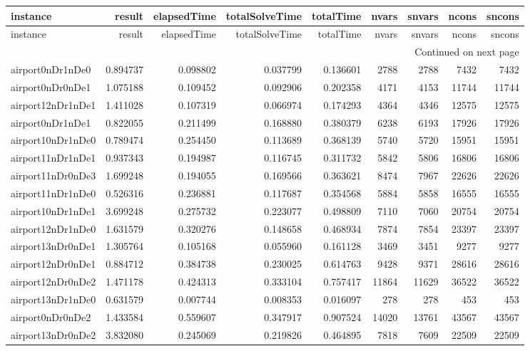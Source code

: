 \begin{longtable}{|l|r|r|r|r|r|r|r|r|}
\toprule
instance & result & elapsedTime & totalSolveTime & totalTime & nvars & snvars & ncons & sncons \\
\midrule
\endfirsthead
\toprule
instance & result & elapsedTime & totalSolveTime & totalTime & nvars & snvars & ncons & sncons \\
\midrule
\endhead
\midrule
\multicolumn{9}{r}{Continued on next page} \\
\midrule
\endfoot
\bottomrule
\endlastfoot
airport0nDr1nDe0 & 0.894737 & 0.098802 & 0.037799 & 0.136601 & 2788 & 2788 & 7432 & 7432 \\
airport0nDr0nDe1 & 1.075188 & 0.109452 & 0.092906 & 0.202358 & 4171 & 4153 & 11744 & 11744 \\
airport12nDr1nDe1 & 1.411028 & 0.107319 & 0.066974 & 0.174293 & 4364 & 4346 & 12575 & 12575 \\
airport0nDr1nDe1 & 0.822055 & 0.211499 & 0.168880 & 0.380379 & 6238 & 6193 & 17926 & 17926 \\
airport10nDr1nDe0 & 0.789474 & 0.254450 & 0.113689 & 0.368139 & 5740 & 5720 & 15951 & 15951 \\
airport11nDr1nDe1 & 0.937343 & 0.194987 & 0.116745 & 0.311732 & 5842 & 5806 & 16806 & 16806 \\
airport11nDr0nDe3 & 1.699248 & 0.194055 & 0.169566 & 0.363621 & 8474 & 7967 & 22626 & 22626 \\
airport11nDr1nDe0 & 0.526316 & 0.236881 & 0.117687 & 0.354568 & 5884 & 5858 & 16555 & 16555 \\
airport10nDr1nDe1 & 3.699248 & 0.275732 & 0.223077 & 0.498809 & 7110 & 7060 & 20754 & 20754 \\
airport12nDr1nDe0 & 1.631579 & 0.320276 & 0.148658 & 0.468934 & 7874 & 7854 & 23397 & 23397 \\
airport13nDr0nDe1 & 1.305764 & 0.105168 & 0.055960 & 0.161128 & 3469 & 3451 & 9277 & 9277 \\
airport12nDr0nDe1 & 0.884712 & 0.384738 & 0.230025 & 0.614763 & 9428 & 9371 & 28616 & 28616 \\
airport12nDr0nDe2 & 1.471178 & 0.424313 & 0.333104 & 0.757417 & 11864 & 11629 & 36522 & 36522 \\
airport13nDr1nDe0 & 0.631579 & 0.007744 & 0.008353 & 0.016097 & 278 & 278 & 453 & 453 \\
airport0nDr0nDe2 & 1.433584 & 0.559607 & 0.347917 & 0.907524 & 14020 & 13761 & 43567 & 43567 \\
airport13nDr0nDe2 & 3.832080 & 0.245069 & 0.219826 & 0.464895 & 7818 & 7609 & 22509 & 22509 \\

\end{longtable}
